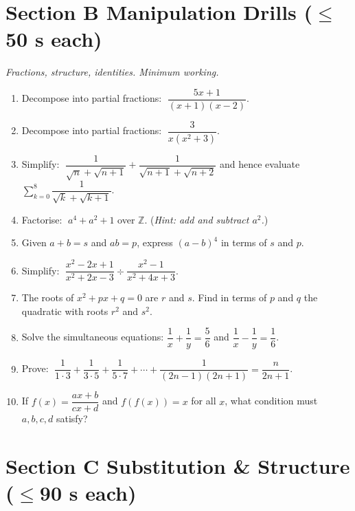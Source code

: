 \documentclass[11pt,a4paper]{article}
\begin{document}
\section*{Section B \quad Manipulation Drills \hfill{\normalfont\small($\leq$50 s each)}}

\noindent\textit{Fractions, structure, identities. Minimum working.}

\begin{enumerate}

\item Decompose into partial fractions: $\;\dfrac{5x+1}{(x+1)(x-2)}$.

\item Decompose into partial fractions: $\;\dfrac{3}{x(x^2+3)}$.

\item Simplify: $\;\dfrac{1}{\sqrt{n}+\sqrt{n+1}} + \dfrac{1}{\sqrt{n+1}+\sqrt{n+2}}$
      and hence evaluate $\displaystyle\sum_{k=0}^{8}\dfrac{1}{\sqrt{k}+\sqrt{k+1}}$.

\item Factorise: $\;a^4 + a^2 + 1$ over $\mathbb{Z}$.
      (\textit{Hint: add and subtract $a^2$.})

\item Given $a + b = s$ and $ab = p$, express $(a-b)^4$ in terms of $s$ and $p$.

\item Simplify: $\;\dfrac{x^2 - 2x + 1}{x^2 + 2x - 3} \div \dfrac{x^2 - 1}{x^2 + 4x + 3}$.

\item The roots of $x^2 + px + q = 0$ are $r$ and $s$.
      Find in terms of $p$ and $q$ the quadratic with roots $r^2$ and $s^2$.

\item Solve the simultaneous equations:
      $\dfrac{1}{x} + \dfrac{1}{y} = \dfrac{5}{6}$ and $\dfrac{1}{x} - \dfrac{1}{y} = \dfrac{1}{6}$.

\item Prove: $\;\dfrac{1}{1\cdot3}+\dfrac{1}{3\cdot5}+\dfrac{1}{5\cdot7}+\cdots+\dfrac{1}{(2n-1)(2n+1)}
      = \dfrac{n}{2n+1}$.

\item If $f(x) = \dfrac{ax+b}{cx+d}$ and $f(f(x)) = x$ for all $x$,
      what condition must $a, b, c, d$ satisfy?

\end{enumerate}

\section*{Section C \quad Substitution \& Structure \hfill{\normalfont\small($\leq$90 s each)}}
\end{document}

